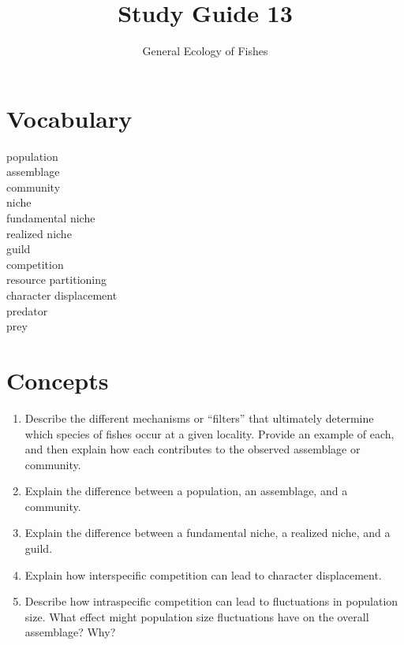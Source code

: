 \documentclass[letterpaper]{tufte-handout}
\title{Study Guide 13}
\author{General Ecology of Fishes}
\date{} %
\begin{document}
\maketitle	%


\section{Vocabulary} 
\vspace{-1\baselineskip}
\begin{multicols}{2}
population \\
assemblage \\
community \\
niche \\
fundamental niche \\
realized niche \\
guild \\
competition \\
resource partitioning \\
character displacement \\
predator \\
prey
\end{multicols}

\section{Concepts}

\begin{enumerate}
	\item Describe the different mechanisms or “filters” that ultimately determine which species of fishes occur at a given locality.  Provide an example of each, and then explain how each contributes to the observed assemblage or community.

	\item Explain the difference between a population, an assemblage, and a community.

	\item Explain the difference between a fundamental niche, a realized niche, and a guild.   

	\item Explain how interspecific competition can lead to character displacement.

	\item Describe how intraspecific competition can lead to fluctuations in population size.  What effect might population size fluctuations have on the overall assemblage?  Why?

\end{enumerate}
\end{document}

